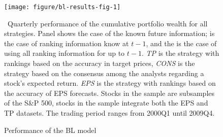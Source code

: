 \documentclass[a4paper,12pt,openright,notitlepage]{report}\usepackage[]{graphicx}\usepackage[]{color}
\makeatletter
\def\maxwidth{ %
  \ifdim\Gin@nat@width>\linewidth
    \linewidth
  \else
    \Gin@nat@width
  \fi
}
\newenvironment{knitrout}{}{} %
\makeatother
\begin{document}
\begin{figure}
\begin{knitrout}
\color{fgcolor}
\texttt{[image: figure/bl-results-fig-1]} 

\end{knitrout}
\caption{Performance of the BL model}
\label{fig:bl-results}
\ Quarterly performance of the cumulative portfolio wealth for all strategies. Panel \tr{} shows the case of the known future information; \naive{} is the case of ranking information know at $t-1$, and the  is the case of using all ranking information for up to $t-1$. \textit{TP} is the strategy with rankings based on the accuracy in target prices, \textit{CONS} is the strategy based on the consensus among the analysts regarding a stock's expected return. \textit{EPS} is the strategy with rankings based on the accuracy of EPS forecasts. Stocks in the \all{} sample are subsamples of the S\&P 500, stocks in the \same{} sample integrate both the EPS and TP datasets. The trading period ranges from 2000Q1 until 2009Q4.
\end{figure}
\end{document}
